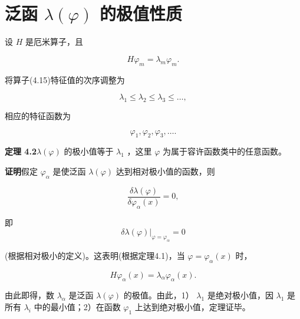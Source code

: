 \section{泛函 $\lambda(\varphi)$ 的极值性质}

设 $H$ 是厄米算子，且

\begin{equation*}
H \varphi_ {m} = \lambda_ {m} \varphi_ {m}.\tag{4.15}
\end{equation*}

将算子(4.15)特征值的次序调整为

\begin{equation*}
\lambda_ {1} \leqslant \lambda_ {2} \leqslant \lambda_ {3} \leqslant \dots ,\tag{4.16}
\end{equation*}

相应的特征函数为

\begin{equation*}
\varphi_ {1}, \varphi_ {2}, \varphi_ {3}, \dots .\tag{4.17}
\end{equation*}

\textbf{定理 4.2}\quad $\lambda(\varphi)$ 的极小值等于 $\lambda_{1}$ ，这里 $\varphi$ 为属于容许函数类中的任意函数。
\par\nopagebreak\vspace{-1.6em}
\vspace{0.15em}

\textbf{证明}\quad 假定 $\varphi_{\alpha}$ 是使泛函 $\lambda (\varphi)$ 达到相对极小值的函数，则

\begin{equation*}
\frac {\delta \lambda (\varphi)}{\delta \varphi_ {\alpha} (x)} = 0,
\end{equation*}

即
\begin{equation*}
\delta \lambda (\varphi) | _ {\varphi = {\varphi} _ {\alpha}} = 0
\end{equation*}

(根据相对极小的定义)。这表明(根据定理4.1)，当 $\varphi = \varphi_{\alpha}(x)$ 时，

\begin{equation*}
H \varphi_ {\alpha} (x) = \lambda_ {\alpha} \varphi_ {\alpha} (x).
\end{equation*}

由此即得，数 $\lambda_{\alpha}$ 是泛函 $\lambda (\varphi)$ 的极值。由此，1） $\lambda_{1}$ 是绝对极小值，因 $\lambda_{1}$ 是所有 $\lambda_{i}$ 中的最小值；2）在函数 $\varphi_{1}$ 上达到绝对极小值，定理证毕。

